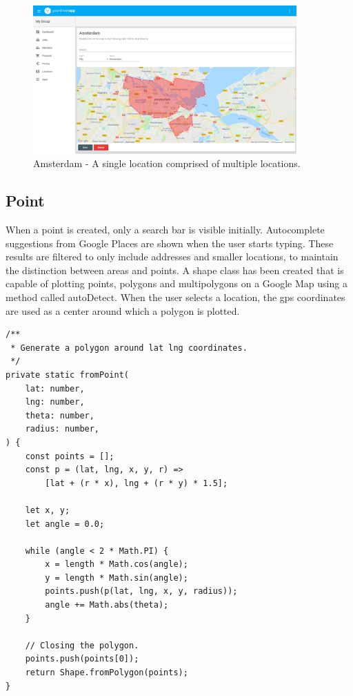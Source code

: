 \begin{figure}[H]
	\centering
	\includegraphics[width=0.9\textwidth]{Amsterdam}
	\caption[Amsterdam Drawn Polygon]{Amsterdam - A single location comprised of multiple locations.}
	\label{fig:Amsterdam Drawn Polygon}
\end{figure}

\subsection{Point}
When a point is created, only a search bar is visible initially. Autocomplete suggestions from Google Places are shown when the user starts typing. These results are filtered to only include addresses and smaller locations, to maintain the distinction between areas and points. A shape class has been created that is capable of plotting points, polygons and multipolygons on a Google Map using a method called autoDetect. When the user selects a location, the gps coordinates are used as a center around which a polygon is plotted.

\begin{center}
\noindent\begin{minipage}{.85\textwidth}
\begin{lstlisting}[caption={Generating Polygon From Point.}, label={lst:Generating Polygon From Point}]
/**
 * Generate a polygon around lat lng coordinates.
 */
private static fromPoint(
	lat: number,
	lng: number,
	theta: number,
	radius: number,
) {
	const points = [];
	const p = (lat, lng, x, y, r) =>
		[lat + (r * x), lng + (r * y) * 1.5];

	let x, y;
	let angle = 0.0;

	while (angle < 2 * Math.PI) {
		x = length * Math.cos(angle);
		y = length * Math.sin(angle);
		points.push(p(lat, lng, x, y, radius));
		angle += Math.abs(theta);
	}

	// Closing the polygon.
	points.push(points[0]);
	return Shape.fromPolygon(points);
}
\end{lstlisting}
\end{minipage}
\end{center}



